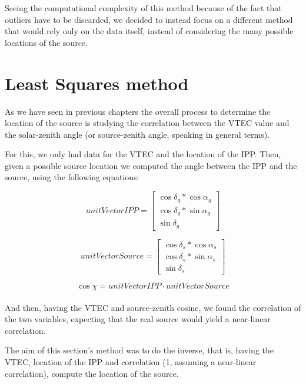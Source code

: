 Seeing the computational complexity of this method because of the fact that outliers have to be discarded, we decided to instead focus on a different method that would rely only on the data itself, instead of considering the many possible locations of the source.

\clearpage
\section{Least Squares method}

As we have seen in previous chapters the overall process to determine the location of the source is studying the correlation between the VTEC value and the solar-zenith angle (or source-zenith angle, speaking in general terms).

For this, we only had data for the VTEC and the location of the IPP. Then, given a possible source location we computed the angle between the IPP and the source, using the following equations:

\begin{equation} \label{eq:61}
unitVectorIPP =	
\begin{bmatrix}
\cos\delta_{g} * \cos\alpha_{g} \\ 
\cos\delta_{g} * \sin\alpha_{g} \\
\sin\delta_{g}
\end{bmatrix}
\end{equation}

\begin{equation} \label{eq:62}
unitVectorSource =	
\begin{bmatrix}
\cos\delta_{s} * \cos\alpha_{s} \\ 
\cos\delta_{s} * \sin\alpha_{s} \\
\sin\delta_{s}
\end{bmatrix}
\end{equation}

\begin{equation} \label{eq:63}
\cos \chi = unitVectorIPP \cdot unitVectorSource
\end{equation}\\

And then, having the VTEC and source-zenith cosine, we found the correlation of the two variables, expecting that the real source would yield a near-linear correlation.

The aim of this section's method was to do the inverse, that is, having the VTEC, location of the IPP and correlation (1, assuming a near-linear correlation), compute the location of the source.


